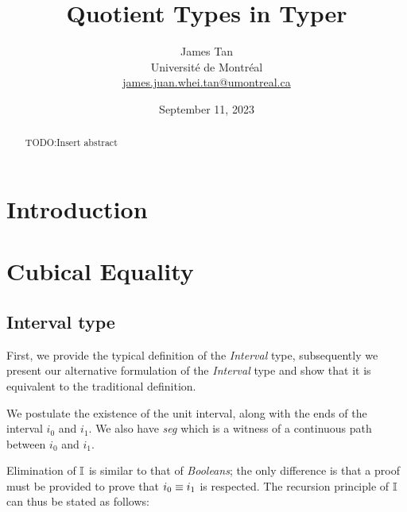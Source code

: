 \documentclass[11pt]{article}
\title{Quotient Types in Typer}
\author{James Tan \\ Université de Montréal \\ \href{mailto:james.juan.whei.tan@umontreal.ca}{james.juan.whei.tan@umontreal.ca}}
\date{September 11, 2023}
\newcommand \id[1] {\textsl{#1}}
\begin{document}
\maketitle

\begin{abstract}
  TODO:Insert abstract
\end{abstract}

\tableofcontents

\section{Introduction}

\section{Cubical Equality}
\subsection{Interval type}
First, we provide the typical definition of the \id{Interval} type, subsequently we present our alternative formulation of the \id{Interval} type and show that it is equivalent to the traditional definition.

\begin{prooftree*}
\end{prooftree*}

\begin{prooftree*}
\end{prooftree*}

\begin{prooftree*}
\end{prooftree*}

\begin{prooftree*}
\end{prooftree*}

We postulate the existence of the unit interval, along with the ends of the interval \id{$i_0$} and \id{$i_1$}. We also have \id{seg} which is a witness of a continuous path between \id{$i_0$} and \id{$i_1$}.

Elimination of $\mathbb{I}$ is similar to that of \id{Booleans}; the only difference is that a proof must be provided to prove that $\eqtype{i_0}{i_1}$ is respected. The recursion principle of $\mathbb{I}$ can thus be stated as follows:

\begin{prooftree*}
\end{prooftree*}
\end{document}
